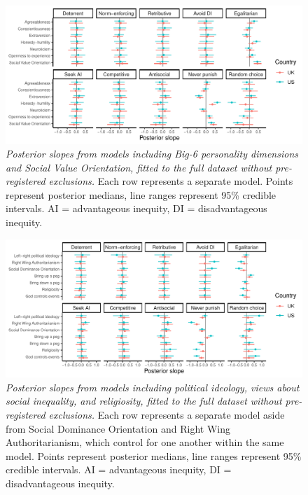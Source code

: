\documentclass[
  man,floatsintext]{apa6}
\begin{document}
\newpage







\begin{figure}
\centering
\includegraphics{manuscript_files/figure-latex/plotAllPers1-1.pdf}
\caption{\label{fig:plotAllPers1}\emph{Posterior slopes from models including Big-6
personality dimensions and Social Value Orientation, fitted to the full dataset
without pre-registered exclusions.} Each row represents a separate model. Points
represent posterior medians, line ranges represent 95\% credible intervals. AI =
advantageous inequity, DI = disadvantageous inequity.}
\end{figure}

\newpage









\begin{figure}
\centering
\includegraphics{manuscript_files/figure-latex/plotAllPolRel1-1.pdf}
\caption{\label{fig:plotAllPolRel1}\emph{Posterior slopes from models including political
ideology, views about social inequality, and religiosity, fitted to the full
dataset without pre-registered exclusions.} Each row represents a separate model
aside from Social Dominance Orientation and Right Wing Authoritarianism, which
control for one another within the same model. Points represent posterior
medians, line ranges represent 95\% credible intervals. AI = advantageous
inequity, DI = disadvantageous inequity.}
\end{figure}
\end{document}
